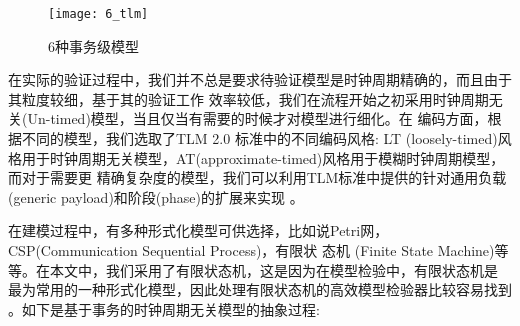 \begin{figure}[ht]
\centering
\texttt{[image: 6\_tlm]}
\caption{6种事务级模型\cite{Cai:2003:TLM:944645.944651}}
\label{fig:6_tlm}
\end{figure} 

在实际的验证过程中，我们并不总是要求待验证模型是时钟周期精确的，而且由于其粒度较细，基于其的验证工作
效率较低，我们在流程开始之初采用时钟周期无关(Un-timed)模型，当且仅当有需要的时候才对模型进行细化。在
编码方面，根据不同的模型，我们选取了TLM 2.0 标准\cite{TLM_Standards}中的不同编码风格: LT
(loosely-timed)风格用于时钟周期无关模型，AT(approximate-timed)风格用于模糊时钟周期模型，而对于需要更
精确复杂度的模型，我们可以利用TLM标准中提供的针对通用负载(generic payload)和阶段(phase)的扩展来实现
\cite{DATE09_Moll}。


在建模过程中，有多种形式化模型可供选择，比如说Petri网，CSP(Communication Sequential Process)，有限状
态机 (Finite State Machine)等等。在本文中，我们采用了有限状态机，这是因为在模型检验中，有限状态机是
最为常用的一种形式化模型，因此处理有限状态机的高效模型检验器比较容易找到
\cite{DBLP:conf/cav/CimattiCGGPRST02}。如下是基于事务的时钟周期无关模型的抽象过程:

